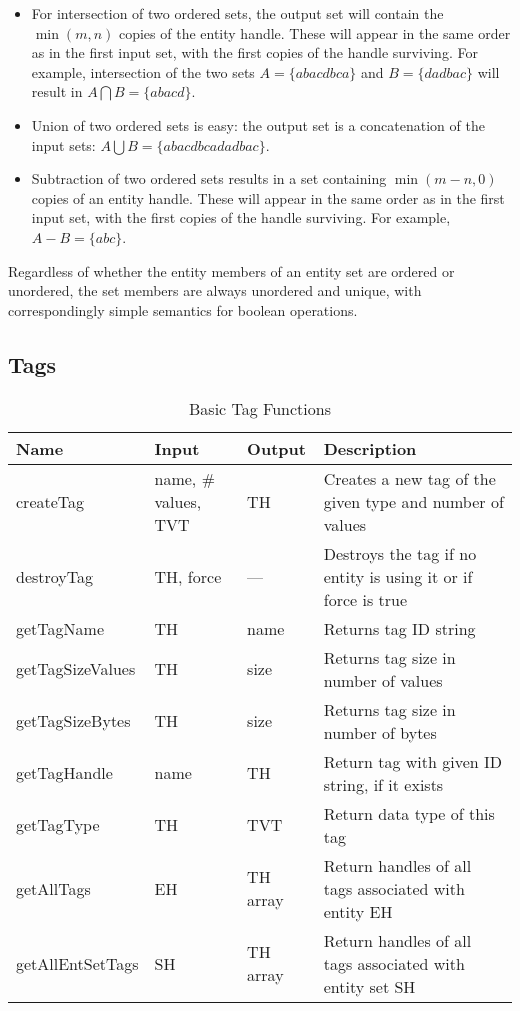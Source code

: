 \begin{itemize}
\item For intersection of two ordered sets, the output set will contain
the $\min\left(m,n\right)$ copies of the entity handle. These will
appear in the same order as in the first input set, with the first
copies of the handle surviving. For example, intersection of the two
sets $A=\textrm{\{$abacdbca$\}}$ and $B=\{ dadbac\}$ will result
in $A\bigcap B=\{ abacd\}$.
\item Union of two ordered sets is easy: the output set is a concatenation
of the input sets: $A\bigcup B=\{ abacdbcadadbac\}$.
\item Subtraction of two ordered sets results in a set containing $\min\left(m-n,0\right)$
copies of an entity handle. These will appear in the same order as
in the first input set, with the first copies of the handle surviving.
For example, $A-B=\{ abc\}$.
\end{itemize}
Regardless of whether the entity members of an entity set are ordered or unordered, the
set members are always unordered and unique, with correspondingly
simple semantics for boolean operations.

\subsection{Tags\label{sub:Tag-Interface}}

\begin{table}[tbp]
\caption{Basic Tag Functions}\label{table:Tags}
{\small
\begin{tabular}{|p{1.25in}|p{0.75in}|p{0.75in}|p{223pt}|}
\hline 
Name&
Input&
Output&
Description\tabularnewline
\hline
\hline 
createTag&
name, \# values, TVT&
TH&
Creates a new tag of the given type and number of values\tabularnewline
\hline 
destroyTag&
TH, force&
---&
Destroys the tag if no entity is using it or if force is true\tabularnewline
\hline 
\hline 
getTagName&
TH&
name&
Returns tag ID string\tabularnewline
\hline 
getTagSizeValues&
TH&
size&
Returns tag size in number of values\tabularnewline
\hline 
getTagSizeBytes&
TH&
size&
Returns tag size in number of bytes\tabularnewline
\hline 
getTagHandle&
name&
TH&
Return tag with given ID string, if it exists\tabularnewline
\hline 
getTagType&
TH&
TVT&
Return data type of this tag\tabularnewline
\hline 
\hline 
getAllTags&
EH&
TH array&
Return handles of all tags associated with entity EH\tabularnewline
\hline 
getAllEntSetTags&
SH&
TH array&
Return handles of all tags associated with entity set SH\tabularnewline
\hline
\end{tabular}
}
\end{table}

